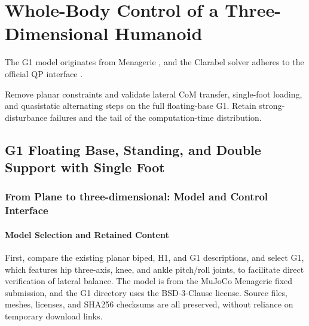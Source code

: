 \chapter{Whole-Body Control of a Three-Dimensional Humanoid}
The G1 model originates from Menagerie \cite{menagerie}, and the Clarabel solver adheres to the official QP interface \cite{clarabel}.


Remove planar constraints and validate lateral CoM transfer, single-foot loading, and quasistatic alternating steps on the full floating-base G1. Retain strong-disturbance failures and the tail of the computation-time distribution.

\section{G1 Floating Base, Standing, and Double Support with Single Foot}

\label{stage:s25}

\subsection{From Plane to three-dimensional: Model and Control Interface}\label{s25-detail-1}

\subsubsection{Model Selection and Retained Content}\label{s25-detail-2}

First, compare the existing planar biped, H1, and G1 descriptions, and select G1, which features hip three-axis, knee, and ankle pitch/roll joints, to facilitate direct verification of lateral balance. The model is from the MuJoCo Menagerie fixed submission, and the G1 directory uses the BSD-3-Clause license. Source files, meshes, licenses, and SHA256 checksums are all preserved, without reliance on temporary download links.

